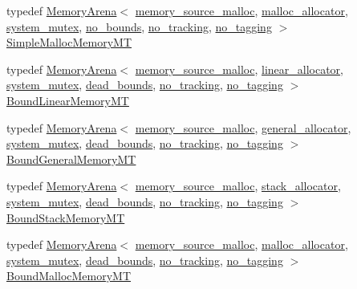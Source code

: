 \begin{DoxyCompactItemize}
\item 
typedef \hyperlink{classcrap_1_1_memory_arena}{Memory\+Arena}$<$ \hyperlink{classcrap_1_1memory__source__malloc}{memory\+\_\+source\+\_\+malloc}, \hyperlink{classcrap_1_1malloc__allocator}{malloc\+\_\+allocator}, \hyperlink{classcrap_1_1system__mutex}{system\+\_\+mutex}, \hyperlink{structcrap_1_1no__bounds}{no\+\_\+bounds}, \hyperlink{structcrap_1_1no__tracking}{no\+\_\+tracking}, \hyperlink{structcrap_1_1no__tagging}{no\+\_\+tagging} $>$ \hyperlink{namespacecrap_a86d2d770530309cb5cb92249b5efadcb}{Simple\+Malloc\+Memory\+M\+T}
\item 
typedef \hyperlink{classcrap_1_1_memory_arena}{Memory\+Arena}$<$ \hyperlink{classcrap_1_1memory__source__malloc}{memory\+\_\+source\+\_\+malloc}, \hyperlink{classcrap_1_1linear__allocator}{linear\+\_\+allocator}, \hyperlink{classcrap_1_1system__mutex}{system\+\_\+mutex}, \hyperlink{structcrap_1_1dead__bounds}{dead\+\_\+bounds}, \hyperlink{structcrap_1_1no__tracking}{no\+\_\+tracking}, \hyperlink{structcrap_1_1no__tagging}{no\+\_\+tagging} $>$ \hyperlink{namespacecrap_a55259fc8a1932b947a5b796be2f346dc}{Bound\+Linear\+Memory\+M\+T}
\item 
typedef \hyperlink{classcrap_1_1_memory_arena}{Memory\+Arena}$<$ \hyperlink{classcrap_1_1memory__source__malloc}{memory\+\_\+source\+\_\+malloc}, \hyperlink{classcrap_1_1general__allocator}{general\+\_\+allocator}, \hyperlink{classcrap_1_1system__mutex}{system\+\_\+mutex}, \hyperlink{structcrap_1_1dead__bounds}{dead\+\_\+bounds}, \hyperlink{structcrap_1_1no__tracking}{no\+\_\+tracking}, \hyperlink{structcrap_1_1no__tagging}{no\+\_\+tagging} $>$ \hyperlink{namespacecrap_a319a79ca62a9c225a5e10d662c366828}{Bound\+General\+Memory\+M\+T}
\item 
typedef \hyperlink{classcrap_1_1_memory_arena}{Memory\+Arena}$<$ \hyperlink{classcrap_1_1memory__source__malloc}{memory\+\_\+source\+\_\+malloc}, \hyperlink{classcrap_1_1stack__allocator}{stack\+\_\+allocator}, \hyperlink{classcrap_1_1system__mutex}{system\+\_\+mutex}, \hyperlink{structcrap_1_1dead__bounds}{dead\+\_\+bounds}, \hyperlink{structcrap_1_1no__tracking}{no\+\_\+tracking}, \hyperlink{structcrap_1_1no__tagging}{no\+\_\+tagging} $>$ \hyperlink{namespacecrap_a9e4f3d9be875850166fb480763ce7abb}{Bound\+Stack\+Memory\+M\+T}
\item 
typedef \hyperlink{classcrap_1_1_memory_arena}{Memory\+Arena}$<$ \hyperlink{classcrap_1_1memory__source__malloc}{memory\+\_\+source\+\_\+malloc}, \hyperlink{classcrap_1_1malloc__allocator}{malloc\+\_\+allocator}, \hyperlink{classcrap_1_1system__mutex}{system\+\_\+mutex}, \hyperlink{structcrap_1_1dead__bounds}{dead\+\_\+bounds}, \hyperlink{structcrap_1_1no__tracking}{no\+\_\+tracking}, \hyperlink{structcrap_1_1no__tagging}{no\+\_\+tagging} $>$ \hyperlink{namespacecrap_a0e1ad1a243444e07c558d2553b3949da}{Bound\+Malloc\+Memory\+M\+T}

\end{DoxyCompactItemize}
